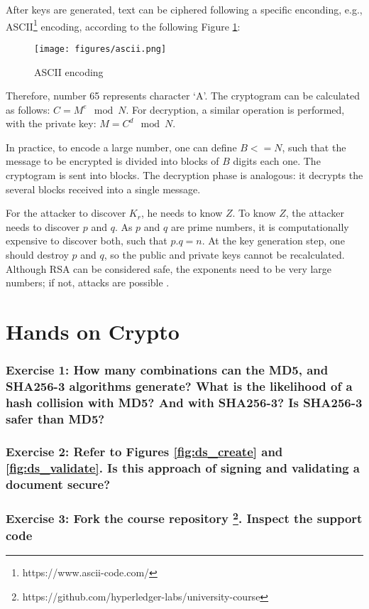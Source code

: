 \documentclass[12pt,a4paper]{article}
\theoremstyle{definition}
\begin{document}
After keys are generated, text can be ciphered following a specific enconding, e.g., ASCII\footnote{https://www.ascii-code.com/} encoding, according to the following Figure \ref{fig:ascii}:

\begin{figure}[h]
\centering
\texttt{[image: figures/ascii.png]}
\caption{ASCII encoding}
\label{fig:ascii}
\end{figure}

Therefore, number 65 represents character `A'. The cryptogram can be calculated as follows: $C = M^e \mod N$. For decryption, a similar operation is performed, with the private key: $M = C^d \mod N$.

In practice, to encode a large number, one can define $B <= N$, such that the message to be encrypted is divided into blocks of $B$ digits each one. The cryptogram is sent into blocks. The decryption phase is analogous: it decrypts the several blocks received into a single message.

For the attacker to discover $K_r$, he needs to know $Z$. To know $Z$, the attacker needs to discover $p$ and $q$. As $p$ and $q$ are prime numbers, it is computationally expensive to discover both, such that $p.q = n$. At the key generation step, one should destroy $p$ and $q$, so the public and private keys cannot be recalculated. Although RSA can be considered safe, the exponents need to be very large numbers; if not, attacks are possible \cite{wiener90}.


\section{Hands on Crypto}

\subsubsection*{Exercise 1: How many combinations can the MD5, and SHA256-3 algorithms generate? What is the likelihood of a hash collision with MD5? And with SHA256-3? Is SHA256-3 safer than MD5?}


\subsubsection*{Exercise 2: Refer to Figures \ref{fig:ds_create} and \ref{fig:ds_validate}. Is this approach of signing and validating a document secure?}

\subsubsection*{Exercise 3: Fork the course repository \footnote{https://github.com/hyperledger-labs/university-course}. Inspect the support code}
\end{document}
